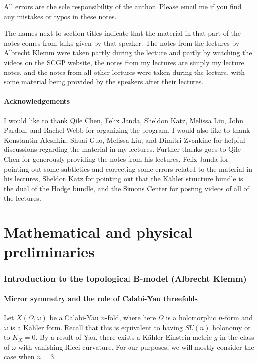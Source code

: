 \documentclass[10pt]{amsart}
\theoremstyle{definition}
\theoremstyle{remark}
\theoremstyle{plain}
\theoremstyle{definition}
\theoremstyle{remark}
\newcommand{\1}{\mathbf{1}}
\newcommand{\2}{\mathbf{2}}
\newcommand{\3}{\mathbf{3}}
\begin{document}
All errors are the sole responsibility of the author. Please email me if you find any mistakes or typos in these notes.

The names next to section titles indicate that the material in that part of the notes comes from talks given by that speaker. The notes from the lectures by Albrecht Klemm were taken partly during the lecture and partly by watching the videos on the SCGP website, the notes from my lectures are simply my lecture notes, and the notes from all other lectures were taken during the lecture, with some material being provided by the speakers after their lectures.

\subsection*{Acknowledgements}%
\label{sub:Acknowledgements}

I would like to thank Qile Chen, Felix Janda, Sheldon Katz, Melissa Liu, John Pardon, and Rachel Webb for organizing the program. I would also like to thank Konstantin Aleshkin, Shuai Guo, Melissa Liu, and Dimitri Zvonkine for helpful discussions regarding the material in my lectures. Further thanks goes to Qile Chen for generously providing the notes from his lectures, Felix Janda for pointing out some subtleties and correcting some errors related to the material in his lectures, Sheldon Katz for pointing out that the K\"ahler structure bundle is the dual of the Hodge bundle, and the Simons Center for posting videos of all of the lectures.


\part{Mathematical and physical preliminaries}
\label{pt:prelim}

\section{Introduction to the topological B-model (Albrecht Klemm)}%
\label{sec:Introduction to the topological B-model (Albrecht Klemm)}

\subsection{Mirror symmetry and the role of Calabi-Yau threefolds}%
\label{sub:Mirror symmetry and the role of Calabi-Yau threefolds}


Let $X(\Omega, \omega)$ be a Calabi-Yau $n$-fold, where here $\Omega$ is a holomorphic $n$-form and $\omega$ is a K\"ahler form. Recall that this is equivalent to having $SU(n)$ holonomy or to $K_X = 0$. By a result of Yau, there exists a K\"ahler-Einstein metric $g$ in the class of $\omega$ with vanishing Ricci curvature. For our purposes, we will mostly consider the case when $n=3$.
\end{document}
